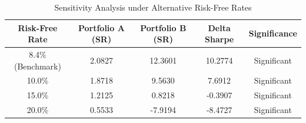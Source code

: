 \begin{table}[htbp]
\centering
\caption{Sensitivity Analysis under Alternative Risk-Free Rates}
\label{tab:sensitivity_analysis}
\begin{tabular}{ccccc}
\hline
\textbf{Risk-Free Rate} & \textbf{Portfolio A (SR)} & \textbf{Portfolio B (SR)} & \textbf{Delta Sharpe} & \textbf{Significance} \\
\hline
8.4\% (Benchmark) & 2.0827 & 12.3601 & 10.2774 & Significant \\
10.0\% & 1.8718 & 9.5630 & 7.6912 & Significant \\
15.0\% & 1.2125 & 0.8218 & -0.3907 & Significant \\
20.0\% & 0.5533 & -7.9194 & -8.4727 & Significant \\
\hline
\end{tabular}
\end{table}
